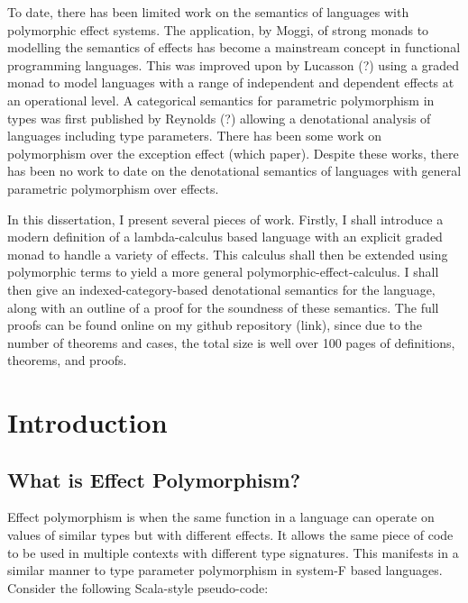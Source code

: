 \documentclass{Report}
\begin{document}
\abstract


    
To date, there has been limited work on the semantics of languages with polymorphic effect systems. The application, by Moggi, of strong monads to modelling the semantics of effects has become a mainstream concept in functional programming languages. This was improved upon by Lucasson (?) using a graded monad to model languages with a range of independent and dependent effects at an operational level. A categorical semantics for parametric polymorphism in types was first published by Reynolds (?) allowing a denotational analysis of languages including type parameters. There has been some work on polymorphism over the exception effect (which paper). Despite these works, there has been no work to date on the denotational semantics of languages with general parametric polymorphism over effects.

In this dissertation, I present several pieces of work. Firstly, I shall introduce a modern definition of a lambda-calculus based language with an explicit graded monad to handle a variety of effects. This calculus shall then be extended using polymorphic terms to yield a more general polymorphic-effect-calculus. I shall then give an indexed-category-based denotational semantics for the language, along with an outline of a proof for the soundness of these semantics. The full proofs can be found online on my github repository (link), since due to the number of theorems and cases, the total size is well over 100 pages of definitions, theorems, and proofs.

\chapter{Introduction}
\section{What is Effect Polymorphism?}
Effect polymorphism is when the same function in a language can operate on values of similar types but with different effects. It allows the same piece of code to be used in multiple contexts with different type signatures. This manifests in a similar manner to type parameter polymorphism in system-F based languages. Consider the following Scala-style pseudo-code:
\end{document}
